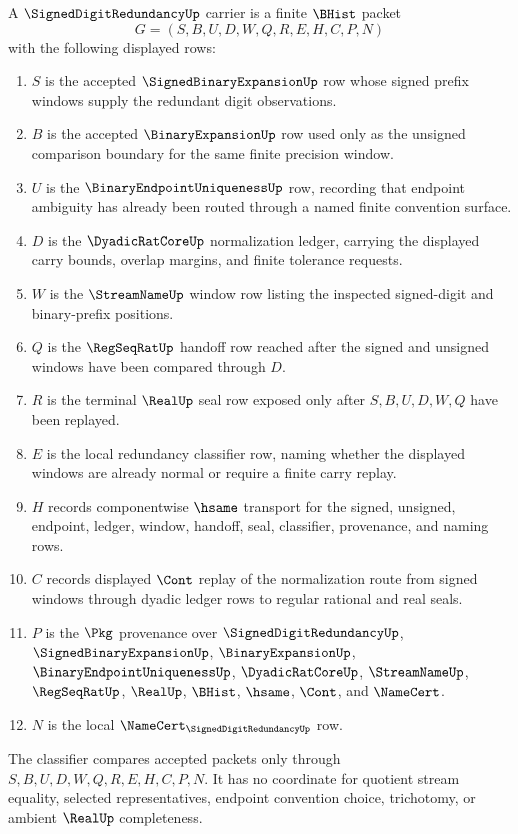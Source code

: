 \begin{definition}
\label{def:signed-digit-redundancy-carrier}
A $\SignedDigitRedundancyUp$ carrier is a finite $\BHist$ packet
$$
G=(S,B,U,D,W,Q,R,E,H,C,P,N)
$$
with the following displayed rows:
\begin{enumerate}
\item $S$ is the accepted $\SignedBinaryExpansionUp$ row whose signed prefix windows supply the redundant digit observations.
\item $B$ is the accepted $\BinaryExpansionUp$ row used only as the unsigned comparison boundary for the same finite precision window.
\item $U$ is the $\BinaryEndpointUniquenessUp$ row, recording that endpoint ambiguity has already been routed through a named finite convention surface.
\item $D$ is the $\DyadicRatCoreUp$ normalization ledger, carrying the displayed carry bounds, overlap margins, and finite tolerance requests.
\item $W$ is the $\StreamNameUp$ window row listing the inspected signed-digit and binary-prefix positions.
\item $Q$ is the $\RegSeqRatUp$ handoff row reached after the signed and unsigned windows have been compared through $D$.
\item $R$ is the terminal $\RealUp$ seal row exposed only after $S,B,U,D,W,Q$ have been replayed.
\item $E$ is the local redundancy classifier row, naming whether the displayed windows are already normal or require a finite carry replay.
\item $H$ records componentwise $\hsame$ transport for the signed, unsigned, endpoint, ledger, window, handoff, seal, classifier, provenance, and naming rows.
\item $C$ records displayed $\Cont$ replay of the normalization route from signed windows through dyadic ledger rows to regular rational and real seals.
\item $P$ is the $\Pkg$ provenance over $\SignedDigitRedundancyUp$, $\SignedBinaryExpansionUp$, $\BinaryExpansionUp$, $\BinaryEndpointUniquenessUp$, $\DyadicRatCoreUp$, $\StreamNameUp$, $\RegSeqRatUp$, $\RealUp$, $\BHist$, $\hsame$, $\Cont$, and $\NameCert$.
\item $N$ is the local $\NameCert_{\SignedDigitRedundancyUp}$ row.
\end{enumerate}
The classifier compares accepted packets only through $S,B,U,D,W,Q,R,E,H,C,P,N$. It has no coordinate for quotient stream equality, selected representatives, endpoint convention choice, trichotomy, or ambient $\RealUp$ completeness.
\end{definition}

